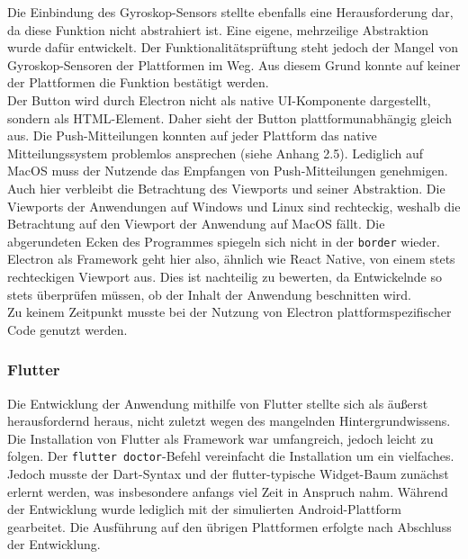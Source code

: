 \documentclass[a4paper]{scrartcl}
\begin{document}
Die Einbindung des Gyroskop-Sensors stellte ebenfalls eine Herausforderung dar, da diese Funktion nicht abstrahiert ist. Eine eigene, mehrzeilige Abstraktion wurde dafür entwickelt. Der Funktionalitätsprüftung steht jedoch der Mangel von Gyroskop-Sensoren der Plattformen im Weg. Aus diesem Grund konnte auf keiner der Plattformen die Funktion bestätigt werden. \\

Der Button wird durch Electron nicht als native UI-Komponente dargestellt, sondern als HTML-Element. Daher sieht der Button plattformunabhängig gleich aus. Die Push-Mitteilungen konnten auf jeder Plattform das native Mitteilungssystem problemlos ansprechen (siehe Anhang 2.5). Lediglich auf MacOS muss der Nutzende das Empfangen von Push-Mitteilungen genehmigen. \\

Auch hier verbleibt die Betrachtung des Viewports und seiner Abstraktion. Die Viewports der Anwendungen auf Windows und Linux sind rechteckig, weshalb die Betrachtung auf den Viewport der Anwendung auf MacOS fällt. Die abgerundeten Ecken des Programmes spiegeln sich nicht in der \texttt{border} wieder. Electron als Framework geht hier also, ähnlich wie React Native, von einem stets rechteckigen Viewport aus. Dies ist nachteilig zu bewerten, da Entwickelnde so stets überprüfen müssen, ob der Inhalt der Anwendung beschnitten wird. \\

Zu keinem Zeitpunkt musste bei der Nutzung von Electron plattformspezifischer Code genutzt werden.

\subsubsection{Flutter}

Die Entwicklung der Anwendung mithilfe von Flutter stellte sich als äußerst herausfordernd heraus, nicht zuletzt wegen des mangelnden Hintergrundwissens. Die Installation von Flutter als Framework war umfangreich, jedoch leicht zu folgen. Der \texttt{flutter doctor}-Befehl vereinfacht die Installation um ein vielfaches. Jedoch musste der Dart-Syntax und der flutter-typische Widget-Baum zunächst erlernt werden, was insbesondere anfangs viel Zeit in Anspruch nahm. Während der Entwicklung wurde lediglich mit der simulierten Android-Plattform gearbeitet. Die Ausführung auf den übrigen Plattformen erfolgte nach Abschluss der Entwicklung. \\
\end{document}
